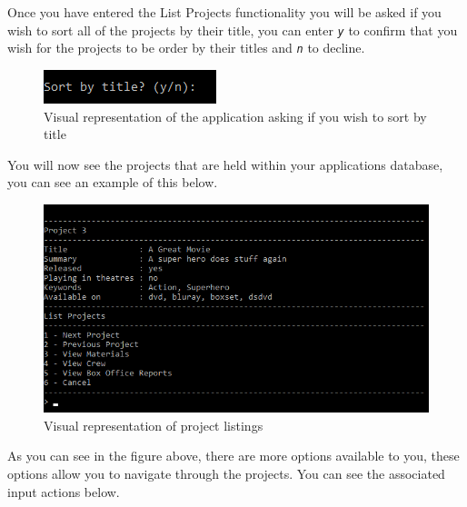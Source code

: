 \documentclass[
  english,
  a4paper,
,tablecaptionabove
]{scrartcl}
\begin{document}
Once you have entered the List Projects functionality you will be asked
if you wish to sort all of the projects by their title, you can enter
\emph{\texttt{y}} to confirm that you wish for the projects to be order
by their titles and \emph{\texttt{n}} to decline.

\begin{figure}
\centering
\includegraphics{images/user-guide/view-mode/sort-by-title.png}
\caption{Visual representation of the application asking if you wish to
sort by title}
\end{figure}

You will now see the projects that are held within your applications
database, you can see an example of this below.

\begin{figure}
\centering
\includegraphics{images/user-guide/view-mode/listed-projects.png}
\caption{Visual representation of project listings}
\end{figure}

As you can see in the figure above, there are more options available to
you, these options allow you to navigate through the projects. You can
see the associated input actions below.
\end{document}
